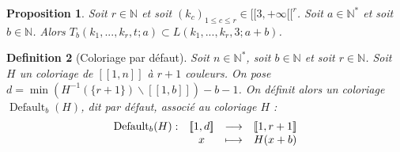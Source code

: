 \documentclass{article}
\newtheorem{definition}{Definition}[section]
\newtheorem{proposition}[definition]{Proposition}
\DeclareMathOperator{\coldef}{Default}
\begin{document}
\begin{proposition}
Soit \(r \in \mathbb{N}\) et soit \((k_c)_{1 \leqslant c \leqslant r} \in {[\![3, +\infty[\![}^r\). Soit \(a \in \mathbb{N}^*\) et soit \(b \in \mathbb{N}\). Alors  \(T_b(k_1, ..., k_r, t; a) \subset L(k_1, ..., k_r, 3; a + b)\).
\end{proposition}

\begin{definition}[Coloriage par défaut]
Soit \(n \in \mathbb{N}^*\), soit \(b \in \mathbb{N}\) et soit \(r \in \mathbb{N}\). Soit \(H\) un coloriage de \([\![1, n]\!]\) à \(r +1\) couleurs. On pose \(d = \min \left(H^{-1}(\{r + 1\}) \backslash [\![1, b]\!] \right) - b  - 1\). On définit alors un coloriage \(\coldef_b(H)\), dit par défaut, associé au coloriage \(H\) :
\[\begin{array}{c c c c}
	\coldef_b(H) : & [\![1, d]\!] & \longrightarrow & [\![1, r + 1]\!] \\
	 & x & \longmapsto & H(x + b)
\end{array}\]
\end{definition}
\end{document}
